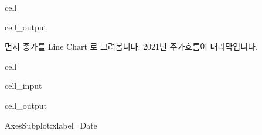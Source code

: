 \documentclass[letterpaper,10pt,english]{jupyterBook}
\begin{document}
\begin{sphinxuseclass}{cell}
\begin{sphinxVerbatimOutput}
\begin{sphinxuseclass}{cell_output}
\end{sphinxuseclass}\end{sphinxVerbatimOutput}

\end{sphinxuseclass}
\sphinxAtStartPar
먼저 종가를 Line Chart 로 그려봅니다. 2021년 주가흐름이 내리막입니다.

\begin{sphinxuseclass}{cell}\begin{sphinxVerbatimInput}

\begin{sphinxuseclass}{cell_input}
\begin{sphinxVerbatim}[commandchars=\\\{\}]
\PYG{p}{[}\PYG{p}{]}
\end{sphinxVerbatim}

\end{sphinxuseclass}\end{sphinxVerbatimInput}
\begin{sphinxVerbatimOutput}

\begin{sphinxuseclass}{cell_output}
\begin{sphinxVerbatim}[commandchars=\\\{\}]
\PYGZlt{}AxesSubplot:xlabel=\PYGZsq{}Date\PYGZsq{}\PYGZgt{}
\end{sphinxVerbatim}

\noindent{}

\end{sphinxuseclass}\end{sphinxVerbatimOutput}

\end{sphinxuseclass}
\end{document}
